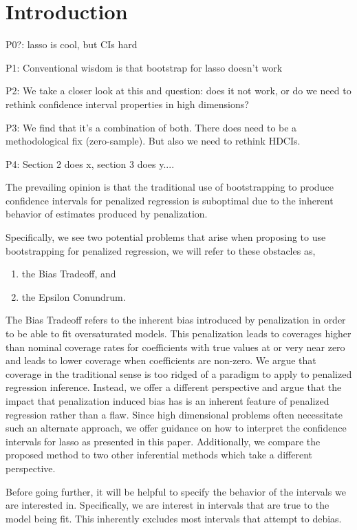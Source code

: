 \section{Introduction}

P0?: lasso is cool, but CIs hard

P1: Conventional wisdom is that bootstrap for lasso doesn't work

P2: We take a closer look at this and question: does it not work, or do we need to rethink confidence interval properties in high dimensions?

P3: We find that it's a combination of both. There does need to be a methodological fix (zero-sample). But also we need to rethink HDCIs.

P4: Section 2 does x, section 3 does y....

The prevailing opinion is that the traditional use of bootstrapping to produce confidence intervals for penalized regression is suboptimal due to the inherent behavior of estimates produced by penalization.

Specifically, we see two potential problems that arise when proposing to use bootstrapping for penalized regression, we will refer to these obstacles as,

\begin{enumerate}
\item the Bias Tradeoff, and
\item the Epsilon Conundrum.
\end{enumerate}

The Bias Tradeoff refers to the inherent bias introduced by penalization in order to be able to fit oversaturated models. This penalization leads to coverages higher than nominal coverage rates for coefficients with true values at or very near zero and leads to lower coverage when coefficients are non-zero. We argue that coverage in the traditional sense is too ridged of a paradigm to apply to penalized regression inference. Instead, we offer a different perspective and argue that the impact that penalization induced bias has is an inherent feature of penalized regression rather than a flaw. Since high dimensional problems often necessitate such an alternate approach, we offer guidance on how to interpret the confidence intervals for lasso as presented in this paper. Additionally, we compare the proposed method to two other inferential methods which take a different perspective.


Before going further, it will be helpful to specify the behavior of the intervals we are interested in. Specifically, we are interest in intervals that are true to the model being fit. This inherently excludes most intervals that attempt to debias.

